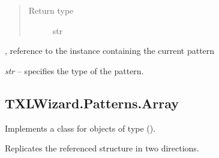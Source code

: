\documentclass[letterpaper,10pt,english]{sphinxmanual}
\begin{document}
\begin{fulllineitems}
\begin{fulllineitems}
\begin{quote}
\begin{description}
\item[{Return type}] \leavevmode
str

\end{description}\end{quote}

\end{fulllineitems}


\begin{fulllineitems}
\label{Chapters/PythonModuleReference/Patterns/TXLWizard.Patterns.AbstractPattern:TXLWizard.Patterns.AbstractPattern.AbstractPattern.ParentStructure}
{\hyperref[Chapters/PythonModuleReference/Patterns/TXLWizard.Patterns.Structure:TXLWizard.Patterns.Structure.Structure]{}}, reference to the  instance containing the current pattern

\end{fulllineitems}


\begin{fulllineitems}
\label{Chapters/PythonModuleReference/Patterns/TXLWizard.Patterns.AbstractPattern:TXLWizard.Patterns.AbstractPattern.AbstractPattern.Type}
\emph{str} -- specifies the type of the pattern.

\end{fulllineitems}


\end{fulllineitems}



\subsection{TXLWizard.Patterns.Array}
\label{Chapters/PythonModuleReference/Patterns/TXLWizard.Patterns.Array:txlwizard-patterns-array}\label{Chapters/PythonModuleReference/Patterns/TXLWizard.Patterns.Array::doc}\label{Chapters/PythonModuleReference/Patterns/TXLWizard.Patterns.Array:module-TXLWizard.Patterns.Array}
Implements a class for  objects of type  ().

Replicates the referenced structure in two directions.
\end{document}
